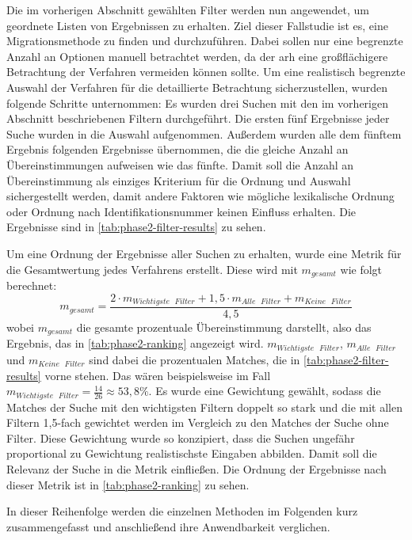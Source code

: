 Die im vorherigen Abschnitt gewählten Filter werden nun angewendet, um geordnete Listen von Ergebnissen zu erhalten. 
Ziel dieser Fallstudie ist es, eine Migrationsmethode zu finden und durchzuführen. 
Dabei sollen nur eine begrenzte Anzahl an Optionen manuell betrachtet werden, da der \gls{arh} eine großflächigere Betrachtung der Verfahren vermeiden können sollte.
Um eine realistisch begrenzte Auswahl der Verfahren für die detaillierte Betrachtung sicherzustellen, wurden folgende Schritte unternommen:
Es wurden drei Suchen mit den im vorherigen Abschnitt beschriebenen Filtern durchgeführt.
Die ersten fünf Ergebnisse jeder Suche wurden in die Auswahl aufgenommen.
Außerdem wurden alle dem fünftem Ergebnis folgenden Ergebnisse übernommen, die die gleiche Anzahl an Übereinstimmungen aufweisen wie das fünfte.
Damit soll die Anzahl an Übereinstimmung als einziges Kriterium für die Ordnung und Auswahl sichergestellt werden, damit andere Faktoren wie mögliche lexikalische Ordnung oder Ordnung nach Identifikationsnummer keinen Einfluss erhalten.
Die Ergebnisse sind in \cref{tab:phase2-filter-results} zu sehen.


Um eine Ordnung der Ergebnisse aller Suchen zu erhalten, wurde eine Metrik für die Gesamtwertung jedes Verfahrens erstellt.
Diese wird mit $m_{gesamt}$ wie folgt berechnet:
\[
m_{gesamt} = \frac{2 \cdot m_{Wichtigste \text{ } Filter} + 1,5 \cdot  m_{Alle \text{ } Filter} +  m_{Keine \text{ } Filter}}{4,5}
\]
wobei $m_{gesamt}$ die gesamte prozentuale Übereinstimmung darstellt, also das Ergebnis, das in \cref{tab:phase2-ranking} angezeigt wird.
$m_{Wichtigste \text{ } Filter}$, $m_{Alle \text{ } Filter}$ und $m_{Keine \text{ } Filter}$ sind dabei die prozentualen Matches, die in \cref{tab:phase2-filter-results} vorne stehen.
Das wären beispielsweise im Fall  $m_{Wichtigste \text{ } Filter} = \frac{14}{26} \approx 53,8\%$.
Es wurde eine Gewichtung gewählt, sodass die Matches der Suche mit den wichtigsten Filtern doppelt so stark und die mit allen Filtern 1,5-fach gewichtet werden im Vergleich zu den Matches der Suche ohne Filter.
Diese Gewichtung wurde so konzipiert, dass die Suchen ungefähr proportional zu Gewichtung realistischste Eingaben abbilden.
Damit soll die Relevanz der Suche in die Metrik einfließen.
Die Ordnung der Ergebnisse nach dieser Metrik ist in \cref{tab:phase2-ranking} zu sehen.


In dieser Reihenfolge werden die einzelnen Methoden im Folgenden kurz zusammengefasst und anschließend ihre Anwendbarkeit verglichen.

